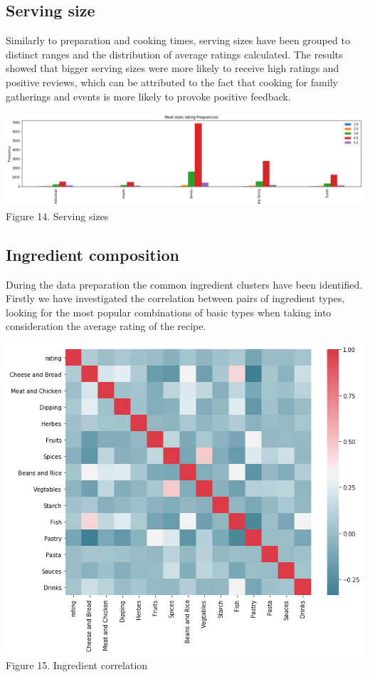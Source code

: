 \documentclass[11pt]{article}
\begin{document}
\subsection{Serving size}

Similarly to preparation and cooking times, serving sizes have been grouped to distinct ranges and the distribution of average ratings calculated. The results showed that bigger serving sizes were more likely to receive high ratings and positive reviews, which can be attributed to the fact that cooking for family gatherings and events is more likely to provoke positive feedback.

\vspace{5mm}
\begin{center}
\includegraphics[scale=0.16]{serving-rating}
\label{serving-rating} Figure 14. Serving sizes
\end{center}
\vspace{5mm}

\subsection{Ingredient composition}

During the data preparation the common ingredient clusters have been identified. Firstly we have investigated the correlation between pairs of ingredient types, looking for the most popular combinations of basic types when taking into consideration the average rating of the recipe.

\vspace{5mm}
\begin{center}
\includegraphics[scale=0.25]{ingredient-pairs} \\
\label{ingredient-pairs} Figure 15. Ingredient correlation
\end{center}
\vspace{5mm}
\end{document}
